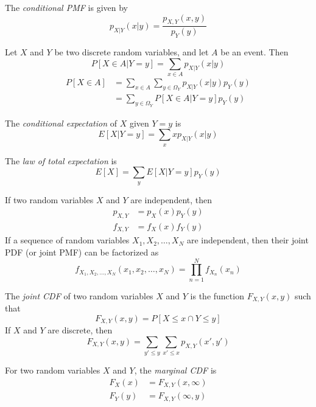 The \emph{conditional PMF} is given by
\begin{equation}
    p_{X|Y}(x|y) = \frac{p_{X,Y}(x,y)}{p_{Y}(y)}
\end{equation}

Let $X$ and $Y$ be two discrete random variables, and
let $A$ be an event. Then
\begin{equation}
    P[X\in A | Y = y] = \sum_{x\in A} p_{X|Y}(x|y)
\end{equation}
\begin{align}
    P[X \in A] & = \sum_{x \in A} \sum_{y \in \Omega_Y} p_{X|Y}(x|y)p_Y(y) \\
               & = \sum_{y\in \Omega_Y} P[X\in A|Y = y]p_Y(y)
\end{align}

The \emph{conditional expectation} of $X$ given $Y=y$ is
\begin{equation}
    E[X|Y=y] = \sum_{x} xp_{X|Y}(x|y)
\end{equation}

The \emph{law of total expectation} is
\begin{equation}
    E[X] = \sum_{y}E[X|Y=y]p_Y(y)
\end{equation}

If two random variables $X$ and $Y$ are independent,
then
\begin{align}
    p_{X,Y}  & = p_X(x)p_Y(y) \\
    f_{X, Y} & = f_X(x)f_Y(y)
\end{align}
If a sequence of random variables
$X_1, X_2, \dots, X_N$ are independent,
then their joint PDF (or joint PMF) can be
factorized as
\begin{equation}
    f_{X_1,X_2,\dots,X_N}\left(x_1,x_2,\dots,x_N\right) = \prod_{n=1}^{N}f_{X_n}(x_n)
\end{equation}

The \emph{joint CDF} of two random variables
$X$ and $Y$ is the function $F_{X,Y}(x,y)$ such
that
\begin{equation}
    F_{X,Y}(x,y) = P\left[X \leq x \cap Y \leq y\right]
\end{equation}
If $X$ and $Y$ are discrete, then
\begin{equation}
    F_{X,Y}(x,y) = \sum_{y'\leq y}\sum_{x' \leq x} p_{X,Y}(x',y')
\end{equation}

For two random variables $X$ and $Y$,
the \emph{marginal CDF} is
\begin{align}
    F_X(x) & = F_{X,Y}(x, \infty) \\
    F_Y(y) & = F_{X,Y}(\infty, y)
\end{align}


